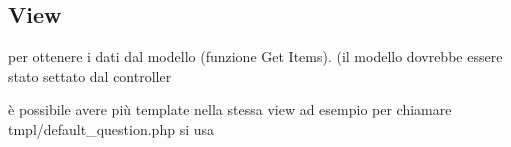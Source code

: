 \documentclass[]{article}
\newenvironment{Shaded}{}{}
\newcommand{\KeywordTok}[1]{\textcolor[rgb]{0.00,0.44,0.13}{\textbf{{#1}}}}
\newcommand{\StringTok}[1]{\textcolor[rgb]{0.25,0.44,0.63}{{#1}}}
\newcommand{\OtherTok}[1]{\textcolor[rgb]{0.00,0.44,0.13}{{#1}}}
\newcommand{\FunctionTok}[1]{\textcolor[rgb]{0.02,0.16,0.49}{{#1}}}
\newcommand{\NormalTok}[1]{{#1}}
\begin{document}
\subsection{View}\label{view}

per ottenere i dati dal modello (funzione Get Items). (il modello
dovrebbe essere stato settato dal controller

\begin{Shaded}
\end{Shaded}

è possibile avere più template nella stessa view ad esempio per chiamare
tmpl/default\_question.php si usa

\begin{Shaded}
\end{Shaded}
\end{document}
